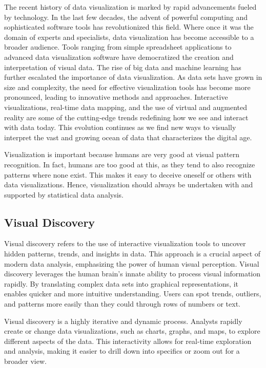 The recent history of data visualization is marked by rapid advancements fueled by technology. In the last few decades, the advent of powerful computing and sophisticated software tools has revolutionized this field. Where once it was the domain of experts and specialists, data visualization has become accessible to a broader audience. Tools ranging from simple spreadsheet applications to advanced data visualization software have democratized the creation and interpretation of visual data. The rise of big data and machine learning has further escalated the importance of data visualization. As data sets have grown in size and complexity, the need for effective visualization tools has become more pronounced, leading to innovative methods and approaches. Interactive visualizations, real-time data mapping, and the use of virtual and augmented reality are some of the cutting-edge trends redefining how we see and interact with data today. This evolution continues as we find new ways to visually interpret the vast and growing ocean of data that characterizes the digital age.

Visualization is important because humans are very good at visual pattern recognition. In fact, humans are too good at this, as they tend to also recognize patterns where none exist. This makes it easy to deceive oneself or others with data visualizations. Hence, visualization should always be undertaken with and supported by statistical data analysis.

\subsection*{Visual Discovery}

Visual discovery refers to the use of interactive visualization tools to uncover hidden patterns, trends, and insights in data. This approach is a crucial aspect of modern data analysis, emphasizing the power of human visual perception. Visual discovery leverages the human brain's innate ability to process visual information rapidly. By translating complex data sets into graphical representations, it enables quicker and more intuitive understanding. Users can spot trends, outliers, and patterns more easily than they could through rows of numbers or text.

Visual discovery is a highly iterative and dynamic process. Analysts rapidly create or change data visualizations, such as charts, graphs, and maps, to explore different aspects of the data. This interactivity allows for real-time exploration and analysis, making it easier to drill down into specifics or zoom out for a broader view.

